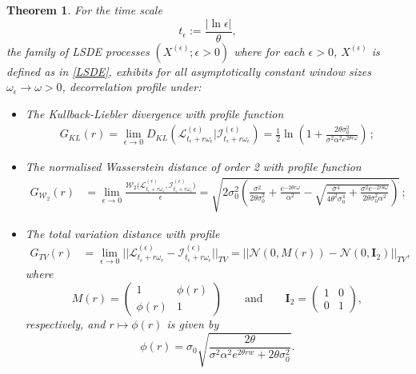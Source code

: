 \documentclass[12pt,thmsa]{article}
\newtheorem{theorem}{Theorem}
\begin{document}
\begin{theorem}\label{theorem1}  For the time scale 
\[
t_\epsilon:=\frac{|\ln \epsilon|}{\theta},
\]
the family of LSDE processes $(X^{(\epsilon)}; \epsilon>0)$ where for each $\epsilon>0$, $X^{(\epsilon)}$ is defined as in  \eqref{LSDE}, exhibits for all asymptotically constant window sizes $\omega_\epsilon \to \omega>0$,  decorrelation profile under: 
\begin{itemize}
	\item[i)] The Kullback-Liebler divergence with profile function
	\begin{eqnarray*}
		G_{KL}(r)=\lim_{\epsilon\to0}D_{KL}( \mathcal{L}^{(\epsilon)}_{t_\epsilon+r\omega_{\epsilon}} \Big|  \mathcal{I}^{(\epsilon)}_{t_\epsilon+r\omega_{\epsilon}} ) = \frac{1}{2} \ln \left(1+\frac{2\theta\sigma_0^2}{\sigma^2 \alpha^2e^{2\theta r\omega}}\right)\,;
	\end{eqnarray*}
	\item[ii)] The  normalised  Wasserstein distance of order 2 with profile function
	\[
	\begin{split}
		G_{\mathcal{W}_2}(r)&=\lim_{\epsilon\to0}\frac{\mathcal{W}_2\Big(\mathcal{L}^{(\epsilon)}_{t_\epsilon+r\omega_{\epsilon}},\mathcal{I}^{(\epsilon)}_{t_\epsilon+r\omega_{\epsilon}}\Big)}{\epsilon}=\sqrt{2\sigma^2_0\left(\frac{\sigma^2}{2\theta\sigma_0^2}+ \frac{e^{-2\theta r\omega}}{\alpha^2}-\sqrt{\frac{\sigma^4}{4\theta^2\sigma_0^4 }+\frac{\sigma^2e^{-2r\theta \omega}}{2\theta\sigma_0^2 \alpha^2}}\right)}\,;
	\end{split}
	\] 
	\item[iii)] The total variation distance with profile
	\[
	\begin{split}
		G_{TV}(r)&=\lim_{\epsilon\to0}||\mathcal{L}^{(\epsilon)}_{t_\epsilon+r\omega_{\epsilon}}-\mathcal{I}^{(\epsilon)}_{t_\epsilon+r\omega_{\epsilon}}||_{TV}=||\mathcal{N}(0, M(r) )-\mathcal{N}(0,\mathbf{I}_2)||_{TV},
	\end{split}
	\] 
	where  
	\[
	M(r)=\begin{pmatrix}
		1 & \phi(r)\\ \phi(r) & 1 \end{pmatrix}\qquad\textrm{and}\qquad \mathbf{I}_2=\begin{pmatrix}1 & 0\\ 0 & 1 \end{pmatrix},
	\]
	respectively, and $r\mapsto\phi(r)$ is given by
	\[
	\phi(r)=\sigma_0\sqrt{\frac{2\theta}{\sigma^2 \alpha^2e^{2\theta rw}+2\theta\sigma_0^2 }}.
	\]
	
\end{itemize}
\end{theorem}
\end{document}
